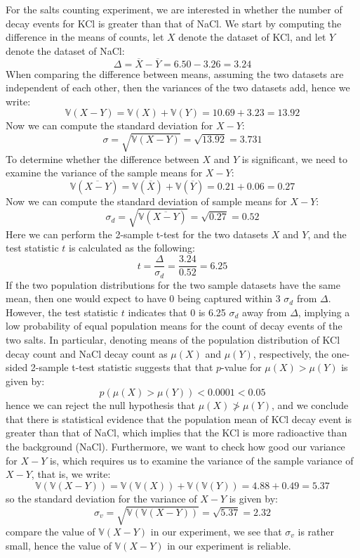 \documentclass[11pt]{book}
\theoremstyle{break}
\theoremstyle{break}
\begin{document}
For the salts counting experiment, we are interested in whether the number of decay events for KCl is greater than that of NaCl. We start by computing the difference in the means of counts, let $X$ denote the dataset of KCl, and let ${Y}$ denote the dataset of NaCl:
$$\Delta = \overline{X} - \overline{Y} = 6.50-3.26 = 3.24$$
When comparing the difference between means, assuming the two datasets are independent of each other, then the variances of the two datasets add, hence we write:
$$\mathbb{V}(X-Y) = \mathbb{V}(X)+\mathbb{V}(Y) = 10.69+3.23 = 13.92 $$
Now we can compute the standard deviation for $X-Y$:
$$\sigma = \sqrt{\mathbb{V}(X-Y)} = \sqrt{ 13.92} = 3.731$$
To determine whether the difference between $X$ and $Y$ is significant, we need to examine the variance of the sample means for $X-Y$:
$$\mathbb{V}\left(\overline{X-Y}\right) = \mathbb{V}\left(\overline{X}\right) + \mathbb{V}\left(\overline{Y}\right) = 0.21+0.06 = 0.27$$
Now we can compute the standard deviation of sample means for $X-Y$:
$$\sigma_d = \sqrt{\mathbb{V}\left(\overline{X-Y}\right)} = \sqrt{0.27} =0.52$$
Here we can perform the 2-sample t-test for the two datasets $X$ and $Y$, and the test statistic $t$ is calculated as the following:
$$ t = \frac{\Delta}{\sigma_{d}} = \frac{3.24}{0.52} = 6.25$$
If the two population distributions for the two sample datasets have the same mean, then one would expect to have $0$ being captured within 3 $\sigma_d$ from $\Delta$. However, the test statistic $t$ indicates that $0$ is 6.25 $\sigma_d$ away from $\Delta$, implying a low probability of equal population means for the count of decay events of the two salts. In particular, denoting means of the population distribution of KCl decay count and NaCl decay count as $\mu(X)$ and $\mu(Y)$, respectively, the one-sided 2-sample t-test statistic suggests that that $p$-value for $\mu(X) > \mu(Y)$ is given by:
$$p\left(\mu(X) > \mu(Y)\right) < 0.0001 < 0.05$$
hence we can reject the null hypothesis that $\mu(X) \not > \mu(Y)$, and we conclude that there is statistical evidence that the population mean of KCl decay event is greater than that of NaCl, which implies that the KCl is more radioactive than the background (NaCl). Furthermore, we want to check how good our variance for $X-Y$ is, which requires us to examine the variance of the sample variance of $X-Y$, that is, we write:
$$\mathbb{V}\left(\mathbb{V}(X-Y)\right) =\mathbb{V}(\mathbb{V}(X)) + \mathbb{V}(\mathbb{V}(Y)) =4.88+0.49=5.37$$ 
so the standard deviation for the variance of $X-Y$ is given by:
$$\sigma_v = \sqrt{\mathbb{V}\left(\mathbb{V}(X-Y)\right)} = \sqrt{5.37} = 2.32$$
compare the value of $\mathbb{V}(X-Y)$ in our experiment, we see that $\sigma_v$ is rather small, hence the value of $\mathbb{V}(X-Y)$ in our experiment is reliable.\\
\end{document}
